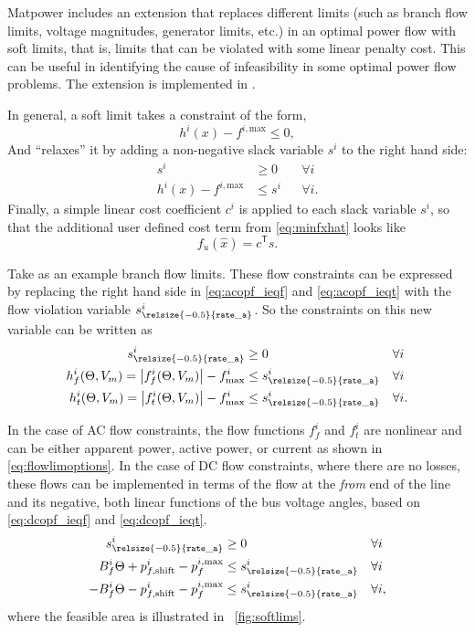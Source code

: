 \documentclass[12pt]{article}
\newcommand{\matpower}[0]{{\sc Matpower}}
\newcommand{\code}[1]{{\relsize{-0.5}{\tt{{#1}}}}}  %
\newcommand{\trans}[1]{{#1}^{\ensuremath{\mathsf{T}}}}  %
\numberwithin{equation}{section}
\numberwithin{table}{section}
\numberwithin{figure}{section}
\begin{document}
\matpower{} includes an extension that replaces different limits (such as branch flow limits, voltage magnitudes, generator limits, etc.)  in an optimal power flow with soft limits, that is, limits that can be violated with some linear penalty cost.
This can be useful in identifying the cause of infeasibility in some optimal power flow problems.
The extension is implemented in \code{toggle\_softlims}.

In general, a soft limit takes a constraint of the form,
\begin{equation}
	h^i(x) - f^{i,\text{max}} \leq 0,
\end{equation}
And ``relaxes'' it by adding a non-negative slack variable $s^i$ to the right hand side:
\begin{align}
	s^i &\geq 0 && \forall{i}  \label{eq:softlims_infbound}\\
	h^i(x) -  f^{i,\text{max}}&\leq s^i && \forall{i}.
\end{align}
Finally, a simple linear cost coefficient $c^i$ is applied to each slack variable $s^i$, so that the additional user defined cost term from \eqref{eq:minfxhat} looks like
\begin{equation}
f_u(\hat{x}) = \trans{c} s.
\label{eq:softlims_cost}
\end{equation}

Take as an example branch flow limits.
These flow constraints can be expressed by replacing the right hand side in \eqref{eq:acopf_ieqf} and \eqref{eq:acopf_ieqt} with the flow violation variable $s_{\code{rate\_a}}^i$. 
So the constraints on this new variable can be written as
\begin{align}
 s_{\code{rate\_a}}^i &\ge 0 && \forall{i}\\
h_f^i(\Theta, V_m) = \left| f_f^i(\Theta, V_m) \right| - f_\mathrm{max}^i &\le s_{\code{rate\_a}}^i && \forall{i} \\
h_t^i(\Theta, V_m) = \left| f_t^i(\Theta, V_m) \right| - f_\mathrm{max}^i &\le s_{\code{rate\_a}}^i && \forall{i}.
\end{align}

In the case of AC flow constraints, the flow functions $f_f^i$ and $f_t^i$ are nonlinear and can be either apparent power, active power, or current as shown in \eqref{eq:flowlimoptions}. In the case of DC flow constraints, where there are no losses, these flows can be implemented in terms of the flow at the \emph{from} end of the line and its negative, both linear functions of the bus voltage angles, based on \eqref{eq:dcopf_ieqf} and \eqref{eq:dcopf_ieqt}.
\begin{align}
s_{\code{rate\_a}}^i &\ge 0 && \forall{i}\\
B_f^i \Theta + p_{f,\mathrm{shift}}^i -  p_f^{i,\mathrm{max}} &\le s_{\code{rate\_a}}^i && \forall{i}  \\
-B_f^i \Theta - p_{f,\mathrm{shift}}^i -  p_f^{i,\mathrm{max}} &\le s_{\code{rate\_a}}^i && \forall{i}, \label{eq:softlimconstraint}
\end{align}
where the feasible area is illustrated in \figurename~\ref{fig:softlims}.
\end{document}
